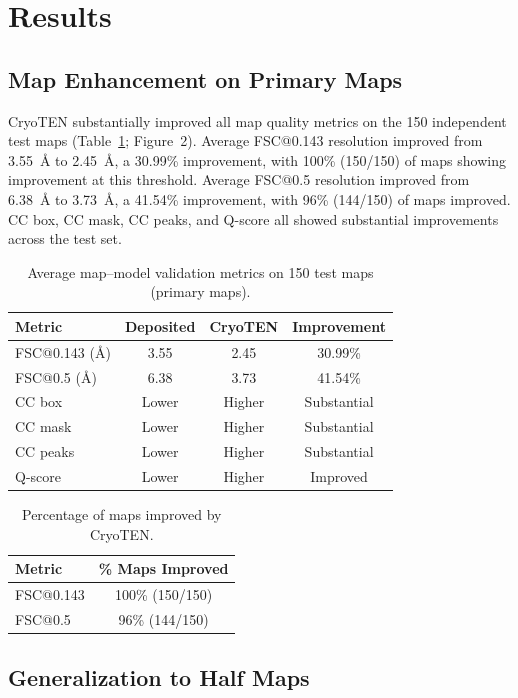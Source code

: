 \documentclass[11pt]{article}
\begin{document}
\section{Results}

\subsection{Map Enhancement on Primary Maps}

CryoTEN substantially improved all map quality metrics on the 150 independent test maps (Table~\ref{tab:primary}; Figure~2). Average FSC@0.143 resolution improved from 3.55~\AA{} to 2.45~\AA{}, a 30.99\% improvement, with 100\% (150/150) of maps showing improvement at this threshold. Average FSC@0.5 resolution improved from 6.38~\AA{} to 3.73~\AA{}, a 41.54\% improvement, with 96\% (144/150) of maps improved. CC box, CC mask, CC peaks, and Q-score all showed substantial improvements across the test set.

\begin{table}[H]
\centering
\caption{Average map--model validation metrics on 150 test maps (primary maps).}
\label{tab:primary}
\begin{tabular}{lccc}
\toprule
Metric & Deposited & CryoTEN & Improvement \\
\midrule
FSC@0.143 (\AA{}) & 3.55 & 2.45 & 30.99\% \\
FSC@0.5 (\AA{}) & 6.38 & 3.73 & 41.54\% \\
CC box & Lower & Higher & Substantial \\
CC mask & Lower & Higher & Substantial \\
CC peaks & Lower & Higher & Substantial \\
Q-score & Lower & Higher & Improved \\
\bottomrule
\end{tabular}
\end{table}

\begin{table}[H]
\centering
\caption{Percentage of maps improved by CryoTEN.}
\label{tab:pct_improved}
\begin{tabular}{lc}
\toprule
Metric & \% Maps Improved \\
\midrule
FSC@0.143 & 100\% (150/150) \\
FSC@0.5 & 96\% (144/150) \\
\bottomrule
\end{tabular}
\end{table}

\subsection{Generalization to Half Maps}
\end{document}
